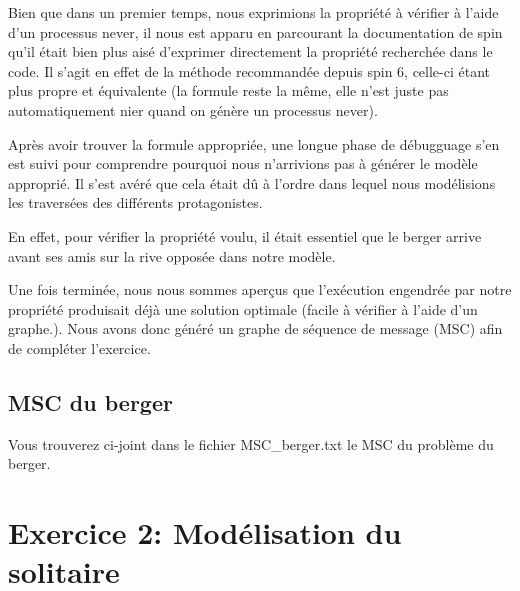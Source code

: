 \documentclass[12pt, a4paper]{report}
\begin{document}
Bien que dans un premier temps, nous exprimions la propriété à vérifier à l'aide d'un processus never, il nous est apparu en parcourant la documentation de spin qu'il était bien plus aisé d'exprimer directement la propriété recherchée dans le code. Il s'agit en effet de la méthode recommandée depuis spin 6, celle-ci étant plus propre et équivalente (la formule reste la même, elle n'est juste pas automatiquement nier quand on génère un processus never).

Après avoir trouver la formule appropriée, une longue phase de débugguage s'en est suivi pour comprendre pourquoi nous n'arrivions pas à générer le modèle approprié. Il s'est avéré que cela était dû à l'ordre dans lequel nous modélisions les traversées des différents protagonistes.

En effet, pour vérifier la propriété voulu, il était essentiel que le berger arrive avant ses amis sur la rive opposée dans notre modèle.

Une fois terminée, nous nous sommes aperçus que l'exécution engendrée par notre propriété produisait déjà une solution optimale (facile à vérifier à l'aide d'un graphe.). Nous avons donc généré un graphe de séquence de message (MSC) afin de compléter l'exercice.

\subsection{MSC du berger}

Vous trouverez ci-joint dans le fichier MSC\_berger.txt le MSC du problème du berger.

\section{Exercice 2: Modélisation du solitaire}
\end{document}
